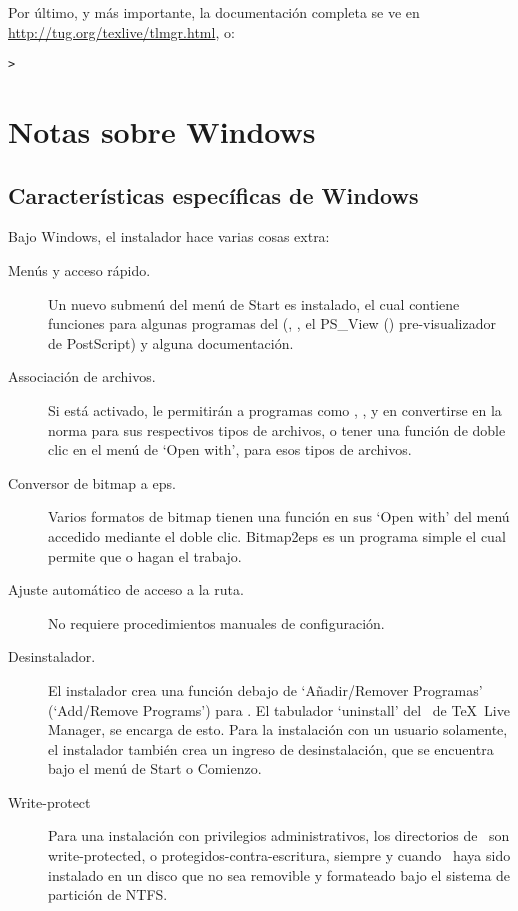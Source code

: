 \documentclass{article}
\begin{document}
Por último, y más importante, la documentación completa se ve en
\url{http://tug.org/texlive/tlmgr.html}, o:
\begin{alltt}
> 
\end{alltt}

\section{Notas sobre Windows}
\label{sec:windows}

\subsection{Características específicas de Windows}
\label{sec:winfeatures}

Bajo Windows, el instalador hace varias cosas extra:
\begin{description}
\item[Menús y acceso rápido.] Un nuevo submenú del menú de Start es
	instalado, el cual contiene funciones para algunas programas
	del \GUI{} (, , el PS\_View
	() pre-visualizador de PostScript) y alguna
	documentación.
\item [Associación de archivos.] Si está activado, le permitirán a
	programas como , , y
	 en convertirse en la norma para sus
	respectivos tipos de archivos, o tener una función de doble
	clic en el menú de `Open with', para esos tipos de archivos.
\item[Conversor de bitmap a eps.] Varios formatos de bitmap tienen una
	función  en sus `Open with' del menú accedido
	mediante el doble clic. Bitmap2eps es un programa simple el
	cual permite que  o  hagan el
	trabajo. 
\item[Ajuste automático de acceso a la ruta.] No requiere
	procedimientos manuales de configuración.
\item[Desinstalador.] El instalador crea una función debajo de
	`Añadir/Remover Programas' (`Add/Remove
		Programs') para \TL. El tabulador `uninstall' del \GUI\ de
	\TeX\ Live Manager, se encarga de esto. Para la
	instalación con un usuario solamente, el instalador
	también crea un ingreso de desinstalación, que se
	encuentra bajo el menú de Start o Comienzo. 
\item[Write-protect] Para una instalación con privilegios
	administrativos, los directorios de \TL\ son
	write-protected, o protegidos-contra-escritura,
	siempre y cuando \TL\ haya sido instalado en un disco
	que no sea removible y formateado bajo el sistema de
	partición de NTFS. 
\end{description}
	
\end{document}
